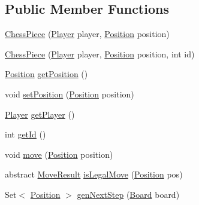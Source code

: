 \subsection*{Public Member Functions}
\begin{DoxyCompactItemize}
\item 
\mbox{\hyperlink{classchess_1_1models_1_1_chess_piece_a59beae5e1f384747a201a4c417ca0afb}{Chess\+Piece}} (\mbox{\hyperlink{enumchess_1_1models_1_1enums_1_1_player}{Player}} player, \mbox{\hyperlink{classchess_1_1models_1_1_position}{Position}} position)
\item 
\mbox{\hyperlink{classchess_1_1models_1_1_chess_piece_aeea9d0c376842325301238b95cabe85c}{Chess\+Piece}} (\mbox{\hyperlink{enumchess_1_1models_1_1enums_1_1_player}{Player}} player, \mbox{\hyperlink{classchess_1_1models_1_1_position}{Position}} position, int id)
\item 
\mbox{\hyperlink{classchess_1_1models_1_1_position}{Position}} \mbox{\hyperlink{classchess_1_1models_1_1_chess_piece_a4ce783eeb2ec6d5cd83af05c11fe8cdb}{get\+Position}} ()
\item 
void \mbox{\hyperlink{classchess_1_1models_1_1_chess_piece_a2e3c62bde5041ca0aa53e0476cc8b600}{set\+Position}} (\mbox{\hyperlink{classchess_1_1models_1_1_position}{Position}} position)
\item 
\mbox{\hyperlink{enumchess_1_1models_1_1enums_1_1_player}{Player}} \mbox{\hyperlink{classchess_1_1models_1_1_chess_piece_aaa3cef5d52e4a228dc01f91133a6c437}{get\+Player}} ()
\item 
int \mbox{\hyperlink{classchess_1_1models_1_1_chess_piece_aaa0ccd6a8327325fa05f7654669516ae}{get\+Id}} ()
\item 
void \mbox{\hyperlink{classchess_1_1models_1_1_chess_piece_a77865fbd52257338c4e376af525155c7}{move}} (\mbox{\hyperlink{classchess_1_1models_1_1_position}{Position}} position)
\item 
abstract \mbox{\hyperlink{enumchess_1_1models_1_1enums_1_1_move_result}{Move\+Result}} \mbox{\hyperlink{classchess_1_1models_1_1_chess_piece_a60088166dd440bf51de4514c3e57841e}{is\+Legal\+Move}} (\mbox{\hyperlink{classchess_1_1models_1_1_position}{Position}} pos)
\item 
Set$<$ \mbox{\hyperlink{classchess_1_1models_1_1_position}{Position}} $>$ \mbox{\hyperlink{classchess_1_1models_1_1_chess_piece_afd359313e83bdef860f9f8236435522f}{gen\+Next\+Step}} (\mbox{\hyperlink{classchess_1_1models_1_1_board}{Board}} board)
\end{DoxyCompactItemize}


